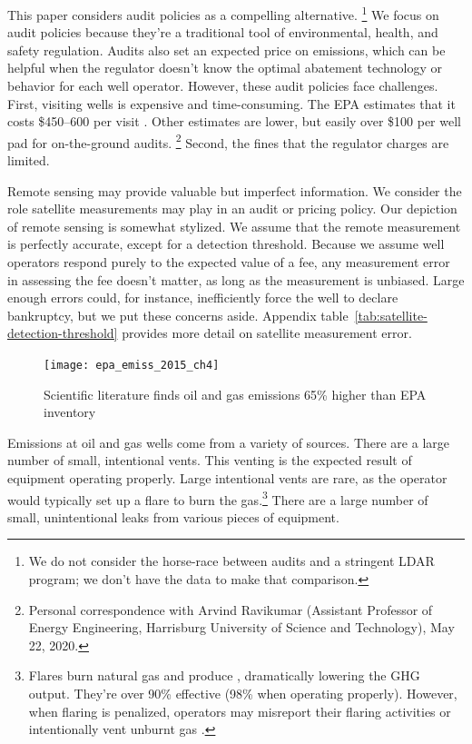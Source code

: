 \documentclass[12pt,oneside,letterpaper]{article}
\theoremstyle{definition}
\begin{document}
\begin{refsection}
This paper considers audit policies as a compelling alternative.%
\footnote{%
We do not consider the horse-race between audits and a stringent \gls{LDAR} program;
we don't have the data to make that comparison.
}
We focus on audit policies because they're a traditional tool of environmental, health, and safety regulation.
Audits also set an expected price on emissions, which can be helpful when the regulator doesn't know the optimal abatement technology or behavior for each well operator.
However, these audit policies face challenges.
First, visiting wells is expensive and time-consuming.
The \gls{EPA} estimates that it costs \$450--600 per visit \parencite{epaRule2020}.
Other estimates are lower, but easily over \$100 per well pad for on-the-ground audits.%
\footnote{Personal correspondence with Arvind Ravikumar (Assistant Professor of Energy Engineering, Harrisburg University of Science and Technology), May 22, 2020.}
Second, the fines that the regulator charges are limited.

Remote sensing may provide valuable but imperfect information.
We consider the role satellite measurements may play in an audit or pricing policy.
Our depiction of remote sensing is somewhat stylized.
We assume that the remote measurement is perfectly accurate, except for a detection threshold.
Because we assume well operators respond purely to the expected value of a fee, any  measurement error in assessing the fee doesn't matter, as long as the measurement is unbiased.
Large enough errors could, for instance, inefficiently force the well to declare bankruptcy, but we put these concerns aside.
Appendix table~\ref{tab:satellite-detection-threshold} provides more detail on satellite measurement error.


\begin{figure}
\vspace*{-0.385\baselineskip}

\centering
\begin{minipage}{0.45\textwidth}
  \caption{Scientific literature finds oil and gas emissions 65\% higher than \gls{EPA} inventory}
  \label{fig:epa-inventory-comparison}
\end{minipage}

\noindent
\texttt{[image: epa\_emiss\_2015\_ch4]}
\vspace*{-2\baselineskip}
\end{figure}


Emissions at oil and gas wells come from a variety of sources.
There are a large number of small, intentional vents.
This venting is the expected result of equipment operating properly.
Large intentional vents are rare, as the operator would typically set up a flare to burn the gas.\footnote{%
Flares burn natural gas and produce , dramatically lowering the \gls{GHG} output.
They're over 90\% effective (98\% when operating properly).
However, when flaring is penalized, operators may misreport their flaring activities
\parencite{Lau:2021}
or intentionally vent unburnt gas
\parencite{Calel/Mahdavi:2020}.
}
There are a large number of small, unintentional leaks from various pieces of equipment.


\end{refsection}
\end{document}
